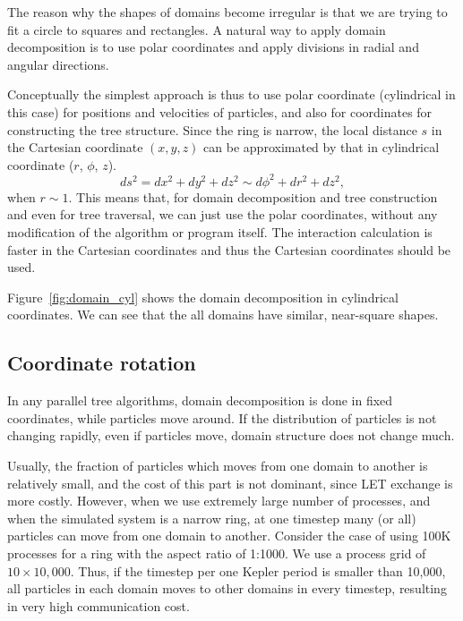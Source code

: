 \documentclass[oribibl]{llncs}
\begin{document}
The reason why the shapes of domains become irregular is that we are
trying to fit a circle to squares and rectangles. A natural way to
apply domain decomposition is to use polar coordinates and apply
divisions in radial and angular directions.

Conceptually the simplest approach is thus to use polar coordinate
(cylindrical in this case) for positions and velocities of particles,
and also for coordinates for constructing the tree structure. Since
the ring is narrow, the local distance $s$ in the Cartesian coordinate
$(x, y, z)$ can be approximated by that in cylindrical coordinate
($r$, $\phi$, $z$).
\begin{equation}
  \label{eq:metric}
  ds^2 = dx^2 + dy^2 + dz^2 \sim d\phi ^2 + dr^2 + dz^2,
\end{equation}
when $r \sim 1$. This means that, for domain decomposition and tree
construction and even for tree traversal, we can just use the polar
coordinates, without any modification of the algorithm or program
itself. The interaction calculation is faster in the Cartesian
coordinates and thus the Cartesian coordinates should be used.

Figure~\ref{fig:domain_cyl} shows the domain decomposition in
cylindrical coordinates. We can see that the all domains have similar,
near-square shapes.

\subsection{Coordinate rotation}
\label{subsec:exptcl}
 
In any parallel tree algorithms, domain decomposition is done in fixed
coordinates, while particles move around. If the distribution of
particles is not changing rapidly, even if particles move, domain
structure does not change much.

Usually, the fraction of particles which moves from one domain to
another is relatively small, and the cost of this part is not
dominant, since LET exchange is more costly. However, when we use
extremely large number of processes, and when the simulated system is
a narrow ring, at one timestep many (or all) particles can move from
one domain to another. Consider the case of using 100K processes for a
ring with the aspect ratio of 1:1000. We use a process grid of
$10\times 10,000$. Thus, if the timestep per one Kepler period is
smaller than 10,000, all particles in each domain moves to other
domains in every timestep, resulting in very high communication cost.
\end{document}
